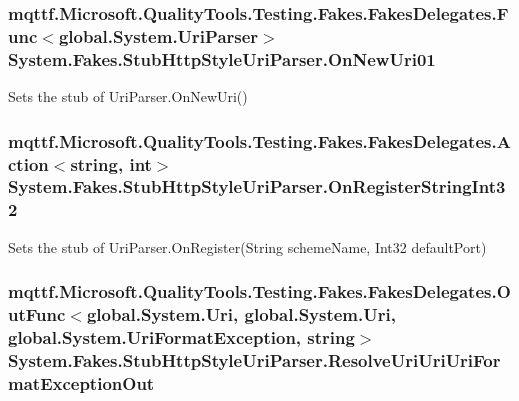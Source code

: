 \hypertarget{class_system_1_1_fakes_1_1_stub_http_style_uri_parser_a45a6010150fff9652b2430c92d8f95ec}{
\subsubsection[{On\-New\-Uri01}]{\setlength{\rightskip}{0pt plus 5cm}mqttf.\-Microsoft.\-Quality\-Tools.\-Testing.\-Fakes.\-Fakes\-Delegates.\-Func$<$global.\-System.\-Uri\-Parser$>$ System.\-Fakes.\-Stub\-Http\-Style\-Uri\-Parser.\-On\-New\-Uri01}}\label{class_system_1_1_fakes_1_1_stub_http_style_uri_parser_a45a6010150fff9652b2430c92d8f95ec}


Sets the stub of Uri\-Parser.\-On\-New\-Uri()

\hypertarget{class_system_1_1_fakes_1_1_stub_http_style_uri_parser_a90034620f2f7f27007bdf7af2ced9641}{
\subsubsection[{On\-Register\-String\-Int32}]{\setlength{\rightskip}{0pt plus 5cm}mqttf.\-Microsoft.\-Quality\-Tools.\-Testing.\-Fakes.\-Fakes\-Delegates.\-Action$<$string, int$>$ System.\-Fakes.\-Stub\-Http\-Style\-Uri\-Parser.\-On\-Register\-String\-Int32}}\label{class_system_1_1_fakes_1_1_stub_http_style_uri_parser_a90034620f2f7f27007bdf7af2ced9641}


Sets the stub of Uri\-Parser.\-On\-Register(\-String scheme\-Name, Int32 default\-Port)

\hypertarget{class_system_1_1_fakes_1_1_stub_http_style_uri_parser_ac35ab465866086ad1083562b7b16c705}{
\subsubsection[{Resolve\-Uri\-Uri\-Uri\-Format\-Exception\-Out}]{\setlength{\rightskip}{0pt plus 5cm}mqttf.\-Microsoft.\-Quality\-Tools.\-Testing.\-Fakes.\-Fakes\-Delegates.\-Out\-Func$<$global.\-System.\-Uri, global.\-System.\-Uri, global.\-System.\-Uri\-Format\-Exception, string$>$ System.\-Fakes.\-Stub\-Http\-Style\-Uri\-Parser.\-Resolve\-Uri\-Uri\-Uri\-Format\-Exception\-Out}}\label{class_system_1_1_fakes_1_1_stub_http_style_uri_parser_ac35ab465866086ad1083562b7b16c705}


